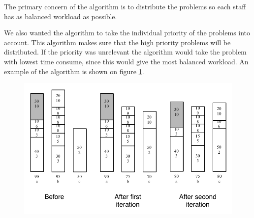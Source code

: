 The primary concern of the algorithm is to distribute the problems so each staff has as balanced workload as possible.

 


We also wanted the algorithm to take the individual priority of the problems into account. 
This algorithm makes sure that the high priority problems will be distributed. 
If the priority was unrelevant the algorithm would take the problem with lowest time consume, since this would give the most balanced workload. 
An example of the algorithm is shown on figure \ref{fig:balanceWorkloadDiagram}. 




\begin{figure}
	\centering
		\includegraphics[scale=0.8]{input/implementation/key_points/balanceWorkloadDiagram.pdf}
	\label{fig:balanceWorkloadDiagram}
\end{figure}

